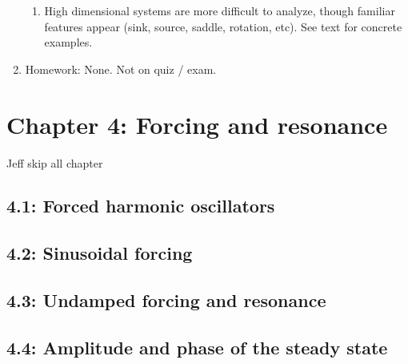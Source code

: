 \documentclass{article}
\begin{document}
\begin{enumerate}
\begin{enumerate}
\item High dimensional systems are more difficult to analyze, though familiar features appear (sink, source, saddle, rotation, etc). See text for concrete examples. 

\end{enumerate}

\item Homework: None. Not on quiz / exam.

\end{enumerate}


\section{Chapter 4: Forcing and resonance}
Jeff skip all chapter

\subsection{4.1: Forced harmonic oscillators}

\subsection{4.2: Sinusoidal forcing}

\subsection{4.3: Undamped forcing and resonance}

\subsection{4.4: Amplitude and phase of the steady state}
\end{document}
